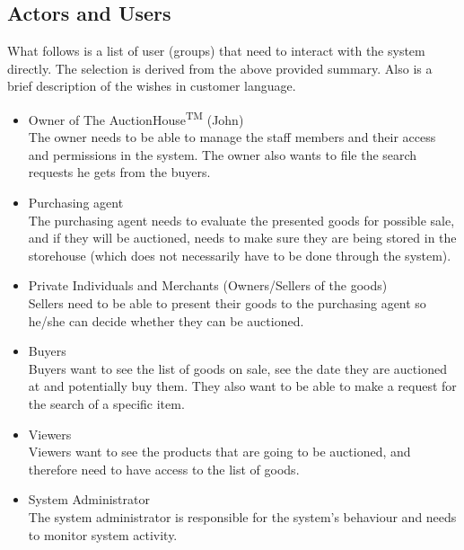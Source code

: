 \subsection{Actors and Users}
What follows is a list of user (groups) that need to interact with the system directly. The selection is derived from the above provided summary. Also is a brief description of the wishes in customer language.
\begin{itemize}[noitemsep]
	\item Owner of The AuctionHouse\textsuperscript{TM} (John)\\
		The owner needs to be able to manage the staff members and their access and permissions in the system. The owner also wants to file the search requests he gets from the buyers.
	\item Purchasing agent\\
		The purchasing agent needs to evaluate the presented goods for possible sale, and if they will be auctioned, needs to make sure they are being stored in the storehouse (which does not necessarily have to be done through the system).
	\item Private Individuals and Merchants (Owners/Sellers of the goods)\\
		Sellers need to be able to present their goods to the purchasing agent so he/she can decide whether they can be auctioned.
	\item Buyers\\
		Buyers want to see the list of goods on sale, see the date they are auctioned at and potentially buy them. They also want to be able to make a request for the search of a specific item.
	\item Viewers\\
		Viewers want to see the products that are going to be auctioned, and therefore need to have access to the list of goods.
	\item System Administrator\\
		The system administrator is responsible for the system's behaviour and needs to monitor system activity.
\end{itemize}


